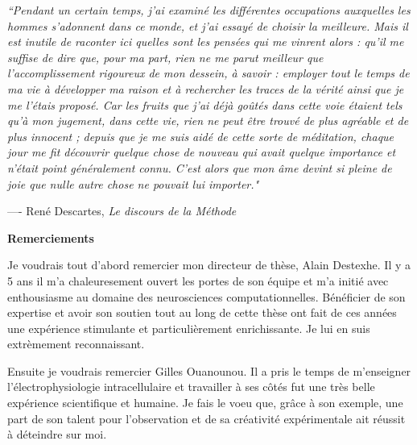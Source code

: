 \documentclass[11pt]{book}
\title{}
\date{}
\author{}
\begin{document}
\thispagestyle{empty}

\vspace*{5cm}

\textit{``Pendant un certain temps, j'ai examin\'e les diff\'erentes
occupations auxquelles les hommes s'adonnent dans ce monde, et j'ai
essay\'e de choisir la meilleure. Mais il est inutile de raconter ici
quelles sont les pens\'ees qui me vinrent alors : qu'il me suffise de
dire que, pour ma part, rien ne me parut meilleur que
l'accomplissement rigoureux de mon dessein, \`a savoir : employer tout
le temps de ma vie \`a d\'evelopper ma raison et \`a rechercher les
traces de la v\'erit\'e ainsi que je me l'\'etais propos\'e. Car les
fruits que j'ai d\'ej\`a go\^ut\'es dans cette voie \'etaient tels
qu'\`a mon jugement, dans cette vie, rien ne peut \^etre trouv\'e de
plus agr\'eable et de plus innocent ; depuis que je me suis aid\'e de
cette sorte de m\'editation, chaque jour me fit d\'ecouvrir quelque
chose de nouveau qui avait quelque importance et n'\'etait point
g\'en\'eralement connu. C'est alors que mon \^ame devint si pleine de
joie que nulle autre chose ne pouvait lui importer."}

\vspace*{1cm}

\hspace{4cm} ---- Ren\'e Descartes, \textit{Le discours de la M\'ethode}

\newpage

\thispagestyle{empty}
\quad 
\newpage


\thispagestyle{empty}

\huge \textbf{Remerciements} \normalsize
\vspace*{.5cm}

Je voudrais tout d'abord remercier mon directeur de thèse, Alain
Destexhe. Il y a 5 ans il m'a chaleuresement ouvert les portes de son
équipe et m'a initié avec enthousiasme au domaine des neurosciences
computationnelles. Bénéficier de son expertise et avoir son soutien
tout au long de cette thèse ont fait de ces années une expérience
stimulante et particulièrement enrichissante. Je lui en suis
extrèmement reconnaissant.

Ensuite je voudrais remercier Gilles Ouanounou. Il a pris le temps de
m'enseigner l'électrophysiologie intracellulaire et travailler à ses
côtés fut une très belle expérience scientifique et humaine. Je fais
le voeu que, grâce à son exemple, une part de son talent pour
l'observation et de sa créativité expérimentale ait réussit à
déteindre sur moi.
\end{document}
